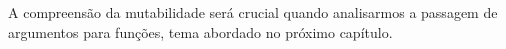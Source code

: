 A compreensão da mutabilidade será crucial quando analisarmos a passagem de argumentos para funções,
tema abordado no próximo capítulo.





























